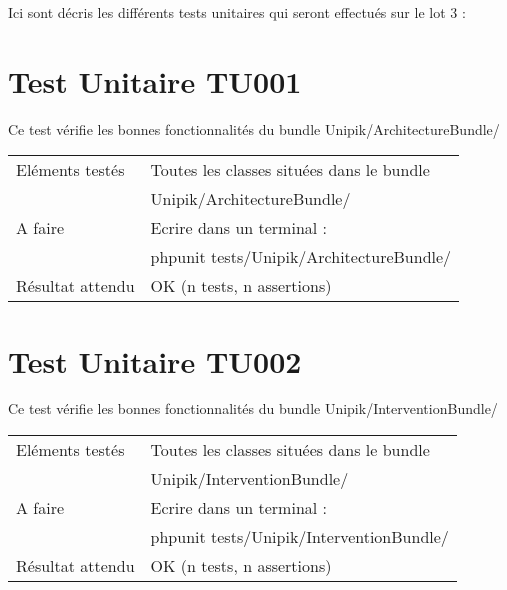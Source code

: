
Ici sont décris les différents tests unitaires qui seront effectués sur le lot 3 :

\section{Test Unitaire TU001}
	
	Ce test vérifie les bonnes fonctionnalités du bundle Unipik/ArchitectureBundle/ \\
				
  	\begin{center}
  		\begin{tabular}[h]{|p{}|p{}|}
		\hline
			Eléments testés & Toutes les classes situées dans le bundle \\ 																& Unipik/ArchitectureBundle/ \\\hline
    			A faire & Ecrire dans un terminal : \\ 
    					& phpunit tests/Unipik/ArchitectureBundle/\\\hline
    			Résultat attendu & OK (n tests, n assertions) \\\hline
     	\end{tabular}
  	\end{center}	
  		
\section{Test Unitaire TU002}
	
	Ce test vérifie les bonnes fonctionnalités du bundle Unipik/InterventionBundle/ \\
				
  	\begin{center}
  		\begin{tabular}[h]{|p{}|p{}|}
		\hline
			Eléments testés & Toutes les classes situées dans le bundle \\ 																& Unipik/InterventionBundle/ \\\hline
    			A faire & Ecrire dans un terminal : \\ 
    					& phpunit tests/Unipik/InterventionBundle/\\\hline
    			Résultat attendu & OK (n tests, n assertions) \\\hline
     	\end{tabular}
  	\end{center}	   		
   		
